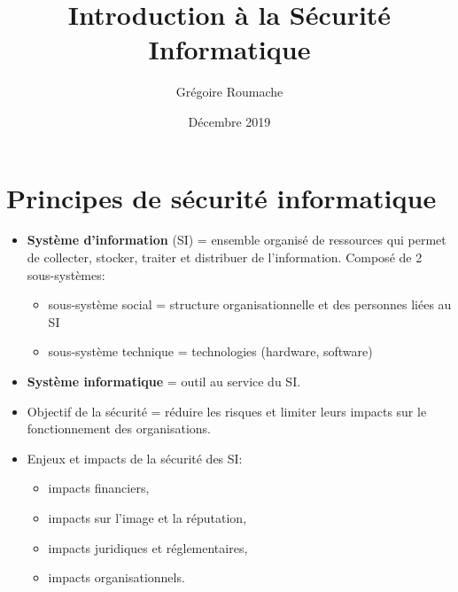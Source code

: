 \documentclass[a4paper]{article}
\title{Introduction à la Sécurité Informatique}
\author{Grégoire Roumache}
\date{Décembre 2019}
\begin{document}
\maketitle















\section{Principes de sécurité informatique}





\begin{itemize}





\item \textbf{Système d'information} (SI) = ensemble organisé de ressources qui permet de collecter, stocker, traiter et distribuer de l'information. Composé de 2 sous-systèmes:
\begin{itemize}
    \item sous-système social = structure organisationnelle et des personnes liées au SI
    \item sous-système technique = technologies (hardware, software)
\end{itemize}





\item \textbf{Système informatique} = outil au service du SI.





\item Objectif de la sécurité = réduire les risques et limiter leurs impacts sur le fonctionnement des organisations.





\item Enjeux et impacts de la sécurité des SI:
\begin{itemize}
    \item impacts financiers,
    \item impacts sur l'image et la réputation,
    \item impacts juridiques et réglementaires,
    \item impacts organisationnels.
\end{itemize}






\end{itemize}
\end{document}
